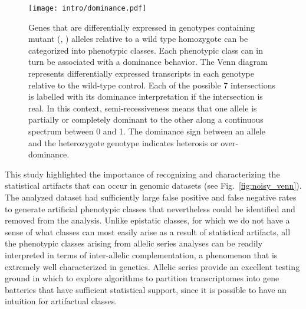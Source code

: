 \begin{figure}
  \centering
  \texttt{[image: intro/dominance.pdf]}
  \caption{Genes that are differentially expressed in genotypes containing
  mutant (, ) alleles relative to a wild type homozygote can
  be categorized into phenotypic classes. Each phenotypic class can in turn be
  associated with a dominance behavior. The Venn diagram represents
  differentially expressed transcripts in each genotype relative to the
  wild-type control. Each of the possible 7 intersections is labelled with its
  dominance interpretation if the intersection is real. In this context,
  semi-recessiveness means that one allele is partially or completely dominant
  to the other along a continuous spectrum between 0 and 1. The dominance sign
  between an allele and the heterozygote genotype indicates heterosis or
  over-dominance.}\label{fig:dominance_expl}
\end{figure}

This study highlighted the importance of recognizing and characterizing the
statistical artifacts that can occur in genomic datasets (see
Fig.~\ref{fig:noisy_venn}). The analyzed dataset had sufficiently large false
positive and false negative rates to generate artificial phenotypic classes that
nevertheless could be identified and removed from the analysis. Unlike epistatic
classes, for which we do not have a sense of what classes can most easily arise
as a result of statistical artifacts, all the phenotypic classes arising from
allelic series analyses can be readily interpreted in terms of inter-allelic
complementation, a phenomenon that is extremely well characterized in genetics.
Allelic series provide an excellent testing ground in which to explore
algorithms to partition transcriptomes into gene batteries that have sufficient
statistical support, since it is possible to have an intuition for artifactual
classes.

